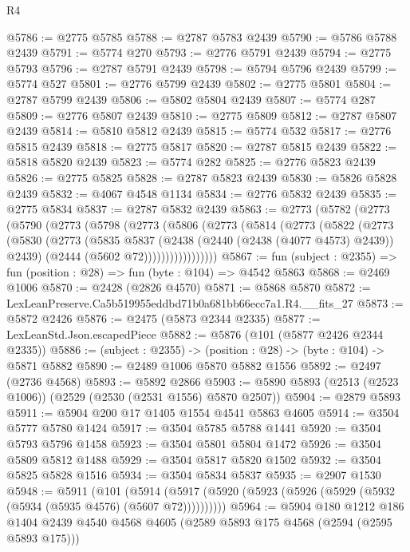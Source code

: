 \begin{lexlean}{R4}
\begin{coremodule}
@5786 := @2775 @5785
@5788 := @2787 @5783 @2439
@5790 := @5786 @5788 @2439
@5791 := @5774 @270
@5793 := @2776 @5791 @2439
@5794 := @2775 @5793
@5796 := @2787 @5791 @2439
@5798 := @5794 @5796 @2439
@5799 := @5774 @527
@5801 := @2776 @5799 @2439
@5802 := @2775 @5801
@5804 := @2787 @5799 @2439
@5806 := @5802 @5804 @2439
@5807 := @5774 @287
@5809 := @2776 @5807 @2439
@5810 := @2775 @5809
@5812 := @2787 @5807 @2439
@5814 := @5810 @5812 @2439
@5815 := @5774 @532
@5817 := @2776 @5815 @2439
@5818 := @2775 @5817
@5820 := @2787 @5815 @2439
@5822 := @5818 @5820 @2439
@5823 := @5774 @282
@5825 := @2776 @5823 @2439
@5826 := @2775 @5825
@5828 := @2787 @5823 @2439
@5830 := @5826 @5828 @2439
@5832 := @4067 @4548 @1134
@5834 := @2776 @5832 @2439
@5835 := @2775 @5834
@5837 := @2787 @5832 @2439
@5863 := @2773
    (@5782
      (@2773
        (@5790
          (@2773
            (@5798
              (@2773
                (@5806
                  (@2773
                    (@5814
                      (@2773
                        (@5822
                          (@2773
                            (@5830
                              (@2773
                                (@5835
                                  @5837
                                  (@2438 (@2440 (@2438 (@4077 @4573) @2439)) @2439)
                                  (@2444 (@5602 @72)))))))))))))))))
@5867 := fun (subject : @2355) => fun (position : @28) => fun (byte : @104) => @4542 @5863
@5868 := @2469 @1006
@5870 := @2428 (@2826 @4570)
@5871 := @5868 @5870
@5872 := LexLeanPreserve.Ca5b519955eddbd71b0a681bb66ecc7a1.R4.__fits_27
@5873 := @5872 @2426
@5876 := @2475 (@5873 @2344 @2335)
@5877 := LexLeanStd.Json.escapedPiece
@5882 := @5876 (@101 (@5877 @2426 @2344 @2335))
@5886 := (subject : @2355) -> (position : @28) -> (byte : @104) -> @5871 @5882
@5890 := @2489 @1006 @5870 @5882 @1556
@5892 := @2497 (@2736 @4568)
@5893 := @5892 @2866
@5903 := @5890 @5893 (@2513 (@2523 @1006)) (@2529 (@2530 (@2531 @1556) @5870 @2507))
@5904 := @2879 @5893
@5911 := @5904 @200 @17 @1405 @1554 @4541 @5863 @4605
@5914 := @3504 @5777 @5780 @1424
@5917 := @3504 @5785 @5788 @1441
@5920 := @3504 @5793 @5796 @1458
@5923 := @3504 @5801 @5804 @1472
@5926 := @3504 @5809 @5812 @1488
@5929 := @3504 @5817 @5820 @1502
@5932 := @3504 @5825 @5828 @1516
@5934 := @3504 @5834 @5837
@5935 := @2907 @1530
@5948 := @5911
    (@101 (@5914 (@5917 (@5920 (@5923 (@5926 (@5929 (@5932 (@5934 (@5935 @4576) (@5607 @72))))))))))
@5964 := @5904
    @180
    @1212
    @186
    @1404
    @2439
    @4540
    @4568
    @4605
    (@2589 @5893 @175 @4568 (@2594 (@2595 @5893 @175)))

\end{coremodule}
\end{lexlean}

